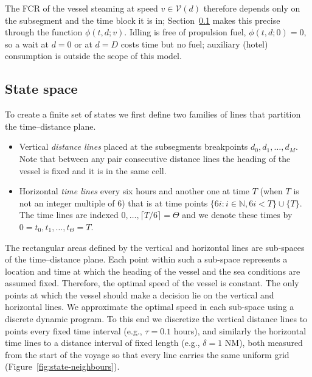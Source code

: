 \documentclass[review,authoryear]{elsarticle}
\begin{document}
The FCR of the vessel steaming at speed $v \in \mathcal{V}(d)$ therefore depends only on the subsegment and the time block it is in; Section~\ref{sec:states} makes this precise through the function $\phi(t,d;v)$. Idling is free of propulsion fuel, $\phi(t,d;0)=0$, so a wait at $d=0$ or at $d=D$ costs time but no fuel; auxiliary (hotel) consumption is outside the scope of this model.




\subsection{State space}
\label{sec:states}

To create a finite set of states we first define two families of lines that partition the time--distance plane.
\begin{itemize}
\item Vertical \emph{distance lines} placed at the subsegments breakpoints $d_0, d_1, \ldots, d_M$. Note that between any pair consecutive distance lines the heading of the vessel is fixed and it is in the same cell. 
\item Horizontal \emph{time lines} every six hours and another one at time $T$ (when $T$ is not an integer multiple of 6) that is at time points $\{6i : i \in \mathbb{N}, 6i < T\} \cup \{T\}$.  The time lines are indexed $0,\ldots, \lceil T/6 \rceil= \Theta$  and we denote these times by 
$0=t_0, t_1,\ldots, t_{\Theta}=T$. 
\end{itemize}



The rectangular areas defined by the vertical and horizontal lines are sub-spaces of the time--distance plane. Each point within such a sub-space represents a location and time at which the heading of the vessel and the sea conditions are assumed fixed. Therefore, the optimal speed of the vessel is constant. The only points at which the vessel should make a decision lie on the vertical and horizontal lines. We approximate the optimal speed in each sub-space using a discrete dynamic program. To this end we discretize the vertical distance lines to points every fixed time interval (e.g., $\tau = 0.1$ hours), and similarly the horizontal time lines to a distance interval of fixed length (e.g., $\delta = 1$ NM), both measured from the start of the voyage so that every line carries the same uniform grid
(Figure~\ref{fig:state-neighbours}).
\end{document}
